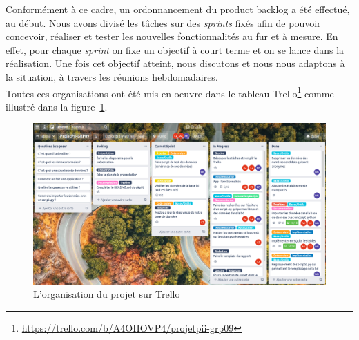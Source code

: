 \documentclass[12pt]{article}
\begin{document}
Conformément à ce cadre, un ordonnancement du product backlog a été effectué, au début. Nous avons divisé les tâches sur des \textsl{sprints} fixés afin de pouvoir concevoir, réaliser et tester les nouvelles fonctionnalités au fur et à mesure.
En effet, pour chaque \textsl{sprint} on fixe un objectif à court terme et on se lance dans la réalisation. Une fois cet objectif atteint, nous discutons et nous nous adaptons à la situation, à travers les réunions hebdomadaires. \\
Toutes ces organisations ont été mis en oeuvre dans le tableau Trello\footnote{\url{https://trello.com/b/A4OHOVP4/projetpii-grp09}} comme illustré dans la figure~\ref{fig:exTrello02062021}.
    \begin{figure}[!h]
        \centering
        \includegraphics[scale = 0.365]{Images/Gestion de Projet/Trello/Trello_02062021.png}
        \caption{L'organisation du projet sur Trello}
        \label{fig:exTrello02062021}
    \end{figure}
\end{document}
